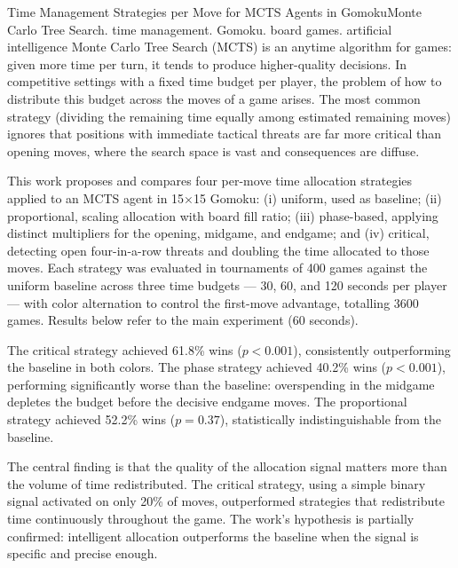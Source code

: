 \documentclass[cic,tc]{iiufrgs}
\begin{document}
\begin{englishabstract}{Time Management Strategies per Move for MCTS Agents in Gomoku}{Monte Carlo Tree Search. time management. Gomoku. board games. artificial intelligence}
Monte Carlo Tree Search (MCTS) is an anytime algorithm for games: given more time per turn, it tends to produce higher-quality decisions. In competitive settings with a fixed time budget per player, the problem of how to distribute this budget across the moves of a game arises. The most common strategy (dividing the remaining time equally among estimated remaining moves) ignores that positions with immediate tactical threats are far more critical than opening moves, where the search space is vast and consequences are diffuse.

This work proposes and compares four per-move time allocation strategies applied to an MCTS agent in 15×15 Gomoku: (i) uniform, used as baseline; (ii) proportional, scaling allocation with board fill ratio; (iii) phase-based, applying distinct multipliers for the opening, midgame, and endgame; and (iv) critical, detecting open four-in-a-row threats and doubling the time allocated to those moves. Each strategy was evaluated in tournaments of 400 games against the uniform baseline across three time budgets — 30, 60, and 120 seconds per player — with color alternation to control the first-move advantage, totalling 3600 games. Results below refer to the main experiment (60 seconds).

The critical strategy achieved 61.8\% wins ($p < 0.001$), consistently outperforming the baseline in both colors. The phase strategy achieved 40.2\% wins ($p < 0.001$), performing significantly worse than the baseline: overspending in the midgame depletes the budget before the decisive endgame moves. The proportional strategy achieved 52.2\% wins ($p = 0.37$), statistically indistinguishable from the baseline.

The central finding is that the quality of the allocation signal matters more than the volume of time redistributed. The critical strategy, using a simple binary signal activated on only 20\% of moves, outperformed strategies that redistribute time continuously throughout the game. The work's hypothesis is partially confirmed: intelligent allocation outperforms the baseline when the signal is specific and precise enough.
\end{englishabstract}

\listoffigures
\end{document}
